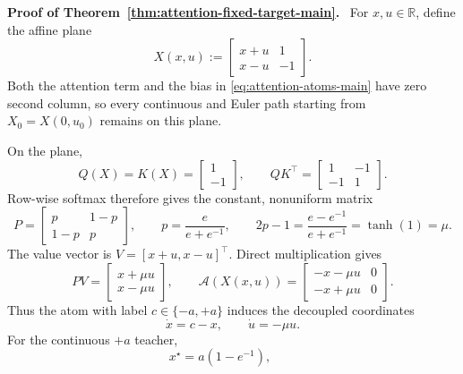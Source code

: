 \documentclass[twoside,11pt]{article}
\renewenvironment{proof}[1][Proof]{\par\noindent\textbf{#1.}\ }{\hfill\BlackBox\par\medskip}
\begin{document}
\begin{proof}[Proof of Theorem~\ref{thm:attention-fixed-target-main}]
For $x,u\in\mathbb R$, define the affine plane
\begin{equation}
 X(x,u):=
 \begin{bmatrix}x+u&1\\x-u&-1\end{bmatrix}.
 \label{eq:app-attn-plane}
\end{equation}
Both the attention term and the bias in
\eqref{eq:attention-atoms-main} have zero second column, so every continuous
and Euler path starting from $X_0=X(0,u_0)$ remains on this plane.

On the plane,
\begin{equation}
 Q(X)=K(X)=\begin{bmatrix}1\\-1\end{bmatrix},
 \qquad
 QK^\top=\begin{bmatrix}1&-1\\-1&1\end{bmatrix}.
 \label{eq:app-attn-scores}
\end{equation}
Row-wise softmax therefore gives the constant, nonuniform matrix
\begin{equation}
 P=\begin{bmatrix}p&1-p\\1-p&p\end{bmatrix},
 \qquad p=\frac{e}{e+e^{-1}},
 \qquad 2p-1=\frac{e-e^{-1}}{e+e^{-1}}=\tanh(1)=\mu.
 \label{eq:app-attn-P}
\end{equation}
The value vector is $V=[x+u,x-u]^\top$.  Direct multiplication gives
\begin{equation}
 PV=\begin{bmatrix}x+\mu u\\x-\mu u\end{bmatrix},
 \qquad
 \mathcal A(X(x,u))
 =\begin{bmatrix}-x-\mu u&0\\-x+\mu u&0\end{bmatrix}.
 \label{eq:app-attn-field}
\end{equation}
Thus the atom with label $c\in\{-a,+a\}$ induces the decoupled coordinates
\begin{equation}
 \dot x=c-x,
 \qquad
 \dot u=-\mu u.
 \label{eq:app-attn-cont-coordinates}
\end{equation}
For the continuous $+a$ teacher,
\begin{equation}
 x^\star=a(1-e^{-1}),
 \qquad

\end{equation}
\end{proof}
\end{document}
